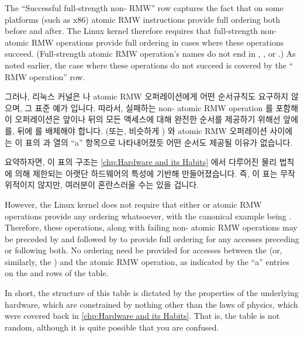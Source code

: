 {{	The ``Successful full-strength non- RMW'' row captures
	the fact that on some platforms (such as x86) atomic RMW instructions
	provide full ordering both before and after.
	The Linux kernel therefore requires that full-strength non-
	atomic RMW operations provide full ordering in cases where these
	operations succeed.
	(Full-strength atomic RMW operation's names do not end in
	, , or .)
	As noted earlier, the case where these operations do not succeed
	is covered by the `` RMW operation'' row.

	\fi

	그러나, 리눅스 커널은  나  atomic RMW
	오퍼레이션에게 어떤 순서규칙도 요구하지 않으며, 그 표준 예가
	 입니다.
	따라서, 실패하는 non- atomic RMW operation 를 포함해 이
	오퍼레이션은 앞이나 뒤의 모든 액세스에 대해 완전한 순서를 제공하기
	위해선 앞에  를, 뒤에
	 를 배체해야 합니다.
	 (또는, 비슷하게
	) 와 atomic RMW 오퍼레이션 사이에는 이 표의
	 과  열의 ``a''
	항목으로 나타내어졌듯 어떤 순서도 제공될 이유가 없습니다.

	요약하자면, 이 표의 구조는
	\cref{chp:Hardware and its Habits} 에서 다루어진 물리 법칙에 의해
	제한되는 아랫단 하드웨어의 특성에 기반해 만들어졌습니다.
	즉, 이 표는 무작위적이지 않지만, 여러분이 혼란스러울 수는 있을 겁니다.

	\iffalse

	However, the Linux kernel does not require that either 
	or  atomic RMW operations provide any ordering
	whatsoever, with the canonical example being .
	Therefore, these operations, along with failing non-
	atomic RMW operations may be preceded by 
	and followed by  to provide full
	ordering for any accesses preceding or following both.
	No ordering need be provided for accesses between the
	 (or, similarly, the
	) and the atomic RMW operation, as
	indicated by the ``a'' entries on the 
	and  rows of the table.

	In short, the structure of this table is dictated by the
	properties of the underlying hardware, which are constrained by
	nothing other than the laws of physics, which were covered back in
	\cref{chp:Hardware and its Habits}.
	That is, the table is not random, although it is quite possible
	that you are confused.

}}
